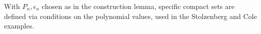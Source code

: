 
With $P_n, \epsilon_n$ chosen as in the construction lemma, specific compact sets are defined via conditions on the polynomial values, used in the Stolzenberg and Cole examples.
